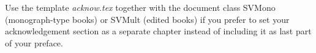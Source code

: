 %
%


Use the template \emph{acknow.tex} together with the document class SVMono (monograph-type books) or SVMult (edited books) if you prefer to set your acknowledgement section as a separate chapter instead of including it as last part of your preface.

